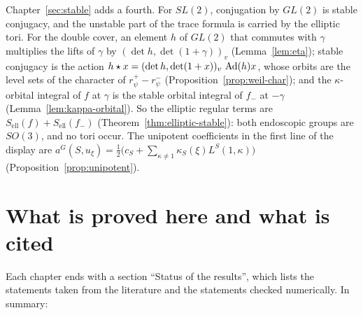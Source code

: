 Chapter~\ref{sec:stable} adds a fourth. For $SL(2)$, conjugation by
$GL(2)$ is stable conjugacy, and the unstable part of the trace formula
is carried by the elliptic tori. For the double cover, an element $h$ of
$GL(2)$ that commutes with $\gamma$ multiplies the lifts of $\gamma$ by
$(\det h,\det(1+\gamma))_v$ (Lemma~\ref{lem:eta}); stable conjugacy is
the action $h\star x=(\det h,\det(1+x))_v\,\operatorname{Ad}(h)x$, whose orbits
are the level sets of the character of $r^+_\psi-r^-_\psi$
(Proposition~\ref{prop:weil-char}); and the $\kappa$-orbital integral of
$f$ at $\gamma$ is the stable orbital integral of $f_-$ at $-\gamma$
(Lemma~\ref{lem:kappa-orbital}). So the elliptic regular terms are
$S_{\mathrm{ell}}(f)+S_{\mathrm{ell}}(f_-)$
(Theorem~\ref{thm:elliptic-stable}): both endoscopic groups are $SO(3)$,
and no tori occur. The unipotent coefficients in the first line of the
display are
$a^G(S,u_\xi)=\frac12\bigl(c_S+\sum_{\kappa\ne1}\kappa_S(\xi)L^S(1,\kappa)
\bigr)$ (Proposition~\ref{prop:unipotent}).

\section{What is proved here and what is cited}\label{sec:proved-cited}

Each chapter ends with a section ``Status of the results'', which
lists the statements taken from the literature and the statements
checked numerically. In summary:

